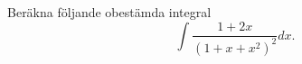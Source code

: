 \documentclass[11pt]{article}
\begin{document}
Beräkna följande obestämda integral
\[
    \int \frac{1 + 2x}{(1 + x + x^2)^2} dx.
\]
\end{document}
